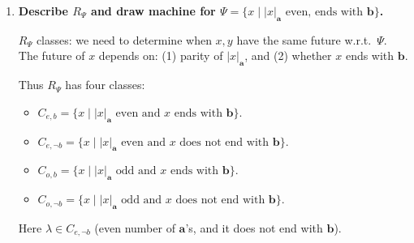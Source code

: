 \begin{enumerate}[{2.}1.]
\begin{enumerate}
\item Why $L=\{x\mid|x|\text{ odd}\}$ can't give this $R_L$: Compute $R_{\{x:|x|\text{ odd}\}}$. We need $x R_L y\Leftrightarrow(\forall z)(|xz|\text{ odd}\Leftrightarrow|yz|\text{ odd})$, i.e., $|x|\equiv|y|\pmod 2$. So $R_L$ has only 2 classes (even-length, odd-length), not 3. $\lambda$ is not distinguished from other even-length strings.

\item Let
\[
A=\{\lambda\},\quad B=\{x:|x|\text{ odd}\},\quad C=\{x:|x|\text{ even and }x\neq\lambda\}.
\]
Checking all 8 unions of $A,B,C$, exactly two give this same 3-class relation:
\[
L=C \quad\text{and}\quad L=A\cup B.
\]
For each of these, $A,B,C$ are pairwise distinguishable:
\begin{itemize}
\item $A$ vs $C$: suffix $z=\lambda$.
\item $A$ vs $B$: suffix $z$ of odd length.
\item $B$ vs $C$: suffix $z=\lambda$.
\end{itemize}
All other unions merge at least one pair of classes.
\end{enumerate}

\item \textbf{Describe $R_\Psi$ and draw machine for $\Psi=\{x\mid|x|_\mathbf{a}\text{ even, ends with }\mathbf{b}\}$.}

$R_\Psi$ classes: we need to determine when $x,y$ have the same future w.r.t.\ $\Psi$. The future of $x$ depends on: (1) parity of $|x|_\mathbf{a}$, and (2) whether $x$ ends with $\mathbf{b}$.

Thus $R_\Psi$ has four classes:
\begin{itemize}
\item $C_{e,b}=\{x\mid |x|_\mathbf{a}\text{ even and }x\text{ ends with }\mathbf{b}\}$.
\item $C_{e,\neg b}=\{x\mid |x|_\mathbf{a}\text{ even and }x\text{ does not end with }\mathbf{b}\}$.
\item $C_{o,b}=\{x\mid |x|_\mathbf{a}\text{ odd and }x\text{ ends with }\mathbf{b}\}$.
\item $C_{o,\neg b}=\{x\mid |x|_\mathbf{a}\text{ odd and }x\text{ does not end with }\mathbf{b}\}$.
\end{itemize}
Here $\lambda\in C_{e,\neg b}$ (even number of $\mathbf a$'s, and it does not end with $\mathbf b$).


\end{enumerate}
